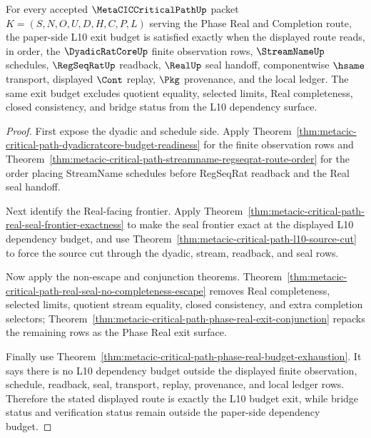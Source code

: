\begin{theorem}
\label{thm:metacic-critical-path-l10-budget-exit}
For every accepted $\MetaCICCriticalPathUp$ packet $K=(S,N,O,U,D,H,C,P,L)$ serving the Phase Real and Completion route, the paper-side L10 exit budget is satisfied exactly when the displayed route reads, in order, the $\DyadicRatCoreUp$ finite observation rows, $\StreamNameUp$ schedules, $\RegSeqRatUp$ readback, $\RealUp$ seal handoff, componentwise $\hsame$ transport, displayed $\Cont$ replay, $\Pkg$ provenance, and the local ledger. The same exit budget excludes quotient equality, selected limits, Real completeness, closed consistency, and bridge status from the L10 dependency surface.
\end{theorem}
\begin{proof}
First expose the dyadic and schedule side. Apply Theorem~\ref{thm:metacic-critical-path-dyadicratcore-budget-readiness} for the finite observation rows and Theorem~\ref{thm:metacic-critical-path-streamname-regseqrat-route-order} for the order placing StreamName schedules before RegSeqRat readback and the Real seal handoff.

Next identify the Real-facing frontier. Apply Theorem~\ref{thm:metacic-critical-path-real-seal-frontier-exactness} to make the seal frontier exact at the displayed L10 dependency budget, and use Theorem~\ref{thm:metacic-critical-path-l10-source-cut} to force the source cut through the dyadic, stream, readback, and seal rows.

Now apply the non-escape and conjunction theorems. Theorem~\ref{thm:metacic-critical-path-real-seal-no-completeness-escape} removes Real completeness, selected limits, quotient stream equality, closed consistency, and extra completion selectors; Theorem~\ref{thm:metacic-critical-path-phase-real-exit-conjunction} repacks the remaining rows as the Phase Real exit surface.

Finally use Theorem~\ref{thm:metacic-critical-path-phase-real-budget-exhaustion}. It says there is no L10 dependency budget outside the displayed finite observation, schedule, readback, seal, transport, replay, provenance, and local ledger rows. Therefore the stated displayed route is exactly the L10 budget exit, while bridge status and verification status remain outside the paper-side dependency budget.
\end{proof}

